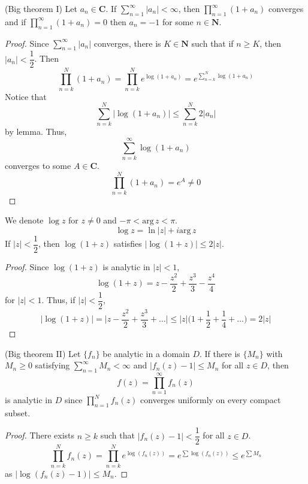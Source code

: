 \vspace{2ex}
\begin{thm}
(Big theorem I) Let $a_{n}\in {\bm C}$. If $\sum ^{\infty }_{n=1}|a_{n}|<\infty $, then $\prod^{\infty }_{n=1}(1+a_{n})$ converges and if $\prod_{n=1}^{\infty }(1+a_{n})=0$ then $a_{n}=-1$ for some $n\in {\bm N}$. 
\end{thm}
\vspace{2ex}
\begin{proof}
Since $\sum ^{\infty }_{n=1}|a_{n}|$ converges, there is $K\in {\bm N}$ such that if $n\geq K$, then $|a_{n}|<\dfrac{1}{2}$. Then 
\[\prod^{N}_{n=k} (1+a_{n})=\prod^{N}_{n=k}e^{\log (1+a_{n})}=e^{\sum ^{N}_{n=k}\log (1+a_{n})}\]
Notice that
\[\sum ^{N}_{n=k}|\log (1+a_{n})|\leq \sum ^{N}_{n=k}2|a_{n}|\]
by lemma. Thus,
\[\sum _{n=k}^{\infty }\log(1+a_{n})\]
converges to some $A\in {\bm C}$. 
\[\prod^{N}_{n=k}(1+a_{n})=e^{A}\ne 0\]
\end{proof}
\vspace{2ex}
\begin{lem}
We denote $\log z$ for $z\ne 0$ and $-\pi <\mathrm{arg}\,z<\pi $. 
\[\log z=\ln |z|+i\mathrm{arg}\,z\]
If $|z|<\dfrac{1}{2}$, then $\log(1+z)$ satisfies $|\log(1+z)|\leq 2|z|$.
\end{lem}
\vspace{2ex}
\begin{proof}
Since $\log (1+z)$ is analytic in $|z|<1$, 
\[\log (1+z)=z-\dfrac{z^2}{2}+\dfrac{z^3}{3}-\dfrac{z^{4}}{4}\]
for $|z|<1$. Thus, if $|z|<\dfrac{1}{2}$, \[|\log (1+z)|=\Big|z-\dfrac{z^2}{2}+\dfrac{z^3}{3}+\ldots \Big|\leq |z|\Big(1+\dfrac{1}{2}+\dfrac{1}{4}+\ldots \Big)=2|z|\]
\end{proof}
\vspace{2ex}
\begin{thm}
(Big theorem II) Let $\{f_{n}\}$ be analytic in a domain $D$. If there is $\{M_{n}\}$ with $M_{n}\geq 0$ satisfying $\sum ^{\infty }_{n=1}M_{n}<\infty $ and $|f_{n}(z)-1|\leq M_{n}$ for all $z\in D$, then
\[f(z)=\prod^{\infty }_{n=1}f_{n}(z)\]
is analytic in $D$ since $\prod_{n=1}^{N}f_{n}(z)$ converges uniformly on every compact subset. 
\end{thm}
\vspace{2ex}
\begin{proof}
There exists $n\geq k$ such that $|f_{n}(z)-1|<\dfrac{1}{2}$ for all $z\in D$.
\[\prod^{N}_{n=k}f_{n}(z)=\prod_{n=k}^{N}e^{\log (f_{n}(z))}=e^{\sum \log(f_{n}(z))}\leq e^{\sum M_{n}}\]
as $|\log (f_{n}(z)-1)|\leq M_{n}$. 
\end{proof}
